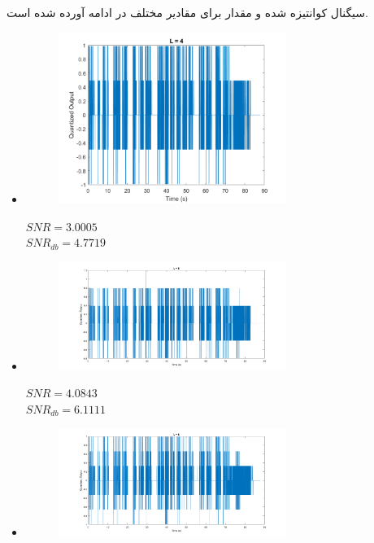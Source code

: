 \documentclass[a4paper]{article}
\begin{document}
\subsection{}
سیگنال کوانتیزه شده و مقدار  برای مقادیر مختلف  در ادامه آورده شده است.
\begin{itemize}
	\item 
	\begin{figure}[H]
		\includegraphics[width=0.7\textwidth]{comsys_fig65.png}\\ 
		\centering
	\end{figure}
	\begin{flushleft}
		$SNR = 3.0005$\\
		$SNR_{db} = 4.7719$
	\end{flushleft}
	\item 
	\begin{figure}[H]
		\includegraphics[width=0.7\textwidth]{comsys_fig66.png}\\ 
		\centering
	\end{figure}
	\begin{flushleft}
		$SNR = 4.0843$\\
		$SNR_{db} = 6.1111$
	\end{flushleft}
	\item 
	\begin{figure}[H]
		\includegraphics[width=0.7\textwidth]{comsys_fig67.png}\\ 

\end{figure}
\end{itemize}
\end{document}
